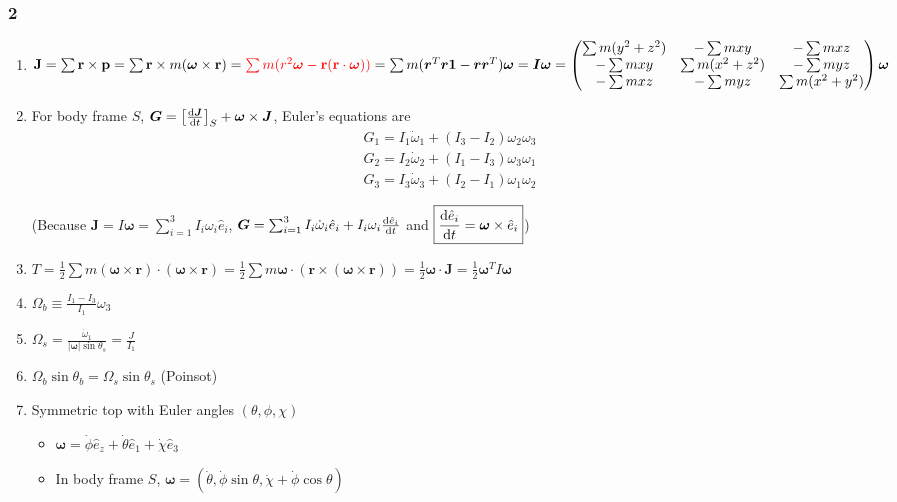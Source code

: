 \documentclass{article}
\theoremstyle{remark}
\begin{document}
\subsubsection*{2}
\begin{enumerate}
    \item $\vb{J}=\sum\vb{r}\times\vb{p}=\sum\vb{r}\times m(\bm{\omega}\times\vb{r})=\textcolor{red}{\sum m(r^2\bm{\omega}-\vb{r}(\vb{r}\cdot\bm{\omega}))} = \sum m(\bm{r}^T\bm{r}\bm{1}-\bm{r}\bm{r}^T)\bm{\omega} = \bm{I}\bm{\omega} = \begin{pmatrix}
        \textstyle\sum m(y^2+z^2) & -\textstyle\sum mxy & -\textstyle\sum mxz\\
        -\textstyle\sum mxy & \textstyle\sum m(x^2+z^2) & -\textstyle\sum myz\\
        -\textstyle\sum mxz & -\textstyle\sum myz & \textstyle\sum m(x^2+y^2)\\
    \end{pmatrix}\bm{\omega} $
    \item For body frame $S$, $\bm{G}=\left[\dv{\bm{J}}{t}\right]_S+\bm{\omega}\times\bm{J}$, Euler's equations are \begin{align*}
        G_1 = I_1\dot\omega_1 + (I_3-I_2)\omega_2\omega_3\\
        G_2 = I_2\dot\omega_2 + (I_1-I_3)\omega_3\omega_1\\
        G_3 = I_3\dot\omega_3 + (I_2-I_1)\omega_1\omega_2
    \end{align*}
    
    (Because $\bm{J}=I\bm{\omega} = \sum_{i=1}^{3} I_i\omega_i\hat{e}_i$, $\bm{G}=\sum_{i=1}^{3} I_i\dot\omega_i\hat{e}_i+I_i\omega_i\dv{\hat{e}_i}{t}$ and $\boxed{\dv{\hat{e}_i}{t}=\bm{\omega}\times\hat{e}_i}$)
    \item $T = \frac{1}{2}\sum m(\bm{\omega}\times\bm{r})\cdot(\bm{\omega}\times\bm{r}) = \frac{1}{2}\sum m\bm{\omega}\cdot(\bm{r}\times(\bm{\omega}\times\bm{r})) = \frac{1}{2}\bm{\omega}\cdot\bm{J} = \frac{1}{2}\bm{\omega}^T I\bm{\omega}$
    \item $\Omega_b\equiv\frac{I_1-I_3}{I_1}\omega_3$
    \item $\Omega_s=\frac{\dot\omega_1}{|\bm{\omega}|\sin\theta_s}=\frac{J}{I_1}$
    \item $\Omega_b\sin\theta_b=\Omega_s\sin\theta_s$ (Poinsot)
    \item Symmetric top with Euler angles $(\theta,\phi,\chi)$
    
    \begin{minipage}[b]{0.6\textwidth}
        \centering
        \begin{itemize}
            \item $\bm{\omega}=\dot\phi\hat{e}_z+\dot\theta\hat{e}_1+\dot\chi\hat{e}_3$
            \item In body frame $S$, $\bm{\omega}=(\dot\theta,\dot\phi\sin\theta,\dot\chi+\dot\phi\cos\theta)$
            

\end{itemize}
\end{minipage}
\end{enumerate}
\end{document}
